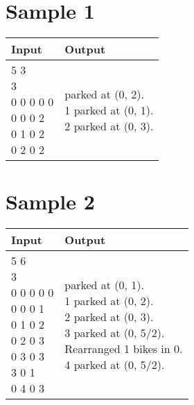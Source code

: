 \documentclass[11pt,a4paper]{article}
\begin{document}
\newpage
\section*{Sample 1}
\begin{longtable}[!h]{|p{}|p{}|}
\hline
\textbf{Input} & \textbf{Output} \\
\hline
\parbox[t]{0.5\textwidth}{ 5 3\\
3\\
0 0 0 0 0\\
0 0 0 2\\
0 1 0 2\\
0 2 0 2\\
}
&
\parbox[t]{0.5\textwidth}{ parked at (0, 2).\\
1 parked at (0, 1).\\
2 parked at (0, 3).
} \\
\hline
\end{longtable}

\section*{Sample 2}
\begin{longtable}[!h]{|p{}|p{}|}
\hline
\textbf{Input} & \textbf{Output} \\
\hline
\parbox[t]{0.5\textwidth}{ 5 6\\
3\\
0 0 0 0 0\\
0 0 0 1\\
0 1 0 2\\
0 2 0 3\\
0 3 0 3\\
3 0 1\\
0 4 0 3\\
}
&
\parbox[t]{0.5\textwidth}{ parked at (0, 1).\\
1 parked at (0, 2).\\
2 parked at (0, 3).\\
3 parked at (0, 5/2).\\
Rearranged 1 bikes in 0.\\
4 parked at (0, 5/2).
} \\
\hline
\end{longtable}
\end{document}
